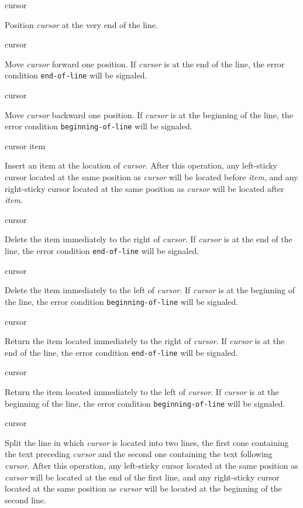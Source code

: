  {cursor}

Position \textit{cursor} at the very end of the line.

 {cursor}

Move \textit{cursor} forward one position.  If \emph{cursor} is at the
end of the line, the error condition \texttt{end-of-line} will be
signaled.

 {cursor}

Move \textit{cursor} backward one position.  If \emph{cursor} is at
the beginning of the line, the error condition
\texttt{beginning-of-line} will be signaled.

 {cursor item}

Insert an item at the location of \textit{cursor}.  After this
operation, any left-sticky cursor located at the same position as
\textit{cursor} will be located before \textit{item}, and any
right-sticky cursor located at the same position as \textit{cursor}
will be located after \textit{item}.

 {cursor}

Delete the item immediately to the right of \emph{cursor}.  If
\emph{cursor} is at the end of the line, the error condition
\texttt{end-of-line} will be signaled.

 {cursor}

Delete the item immediately to the left of \emph{cursor}.  If
\emph{cursor} is at the beginning of the line, the error condition
\texttt{beginning-of-line} will be signaled.

 {cursor}

Return the item located immediately to the right of \textit{cursor}.
If \emph{cursor} is at the end of the line, the error condition
\texttt{end-of-line} will be signaled.

 {cursor}

Return the item located immediately to the left of \textit{cursor}.
If \emph{cursor} is at the beginning of the line, the error condition
\texttt{beginning-of-line} will be signaled.

 {cursor}

Split the line in which \textit{cursor} is located into two lines, the
first cone containing the text preceding \textit{cursor} and the
second one containing the text following \textit{cursor}.  After this
operation, any left-sticky cursor located at the same position as
\textit{cursor} will be located at the end of the first line, and any
right-sticky cursor located at the same position as \textit{cursor}
will be located at the beginning of the second line.

